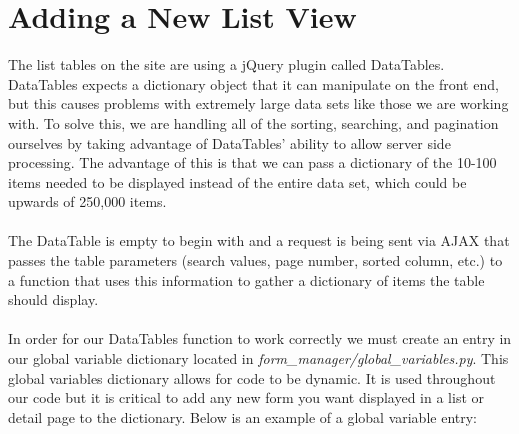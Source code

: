 \documentclass{article}
\begin{document}
\section{Adding a New List View}
The list tables on the site are using a jQuery plugin called DataTables.  DataTables expects a dictionary object that it can manipulate on the front end, but this causes problems with extremely large data sets like those we are working with. To solve this, we are handling all of the sorting, searching, and pagination ourselves by taking advantage of DataTables' ability to allow server side processing. 
The advantage of this is that we can pass a dictionary of the 10-100 items needed to be displayed instead of the entire data set, which could be upwards of 250,000 items.
\\\\The DataTable is empty to begin with and a request is being sent via AJAX that passes the table parameters (search values, page number, sorted column, etc.) to a function that uses this information to gather a dictionary of items the table should display. 
\\\\In order for our DataTables function to work correctly we must create an entry in our global variable dictionary located in \textit{form\_manager/global\_variables.py}.  This global variables dictionary allows for code to be dynamic.  It is used throughout our code but it is critical to add any new form you want displayed in a list or detail page to the dictionary.  Below is an example of a global variable entry:
\end{document}

